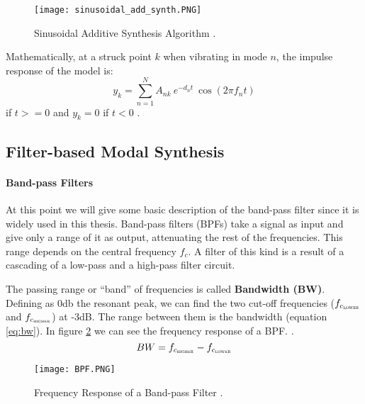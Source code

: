 \begin{figure}[H]
  \centering
    \texttt{[image: sinusoidal\_add\_synth.PNG]}
      \caption{Sinusoidal Additive Synthesis Algorithm \cite{Cook:2002:RSS:515316}.}
      \label{fig:sin_add_synth}
\end{figure}

Mathematically, at a struck point $k$ when vibrating in mode $n$, the impulse response of the model is:
\begin{equation}\label{eq:modal_response}
y_k = \sum\limits_{n=1}^{N} A_{nk}\ e^{-d_n t}\ \cos(2 \pi f_nt)
\end{equation}
if $t>=0$ and $y_k = 0$ if $t<0$ \cite{van2001foleyautomatic}.

\subsection{Filter-based Modal Synthesis}\label{sec:add_synth}

\paragraph{Band-pass Filters\\}\label{par:bpf}

At this point we will give some basic description of the band-pass filter since it is widely used in this thesis. Band-pass filters (BPFs) take a signal as input and give only a range of it as output, attenuating the rest of the frequencies. This range depends on the central frequency $f_c$. A filter of this kind is a result of a cascading of a low-pass and a high-pass filter circuit.

The passing range or ``band'' of frequencies is called \textbf{Bandwidth (BW)}. Defining as 0db the resonant peak, we can find the two cut-off frequencies ($f_{c{_\textsc{lower}}}$ and $f_{c_{\textsc{higher}}}$) at -3dB. The range between them is the bandwidth (equation \ref{eq:bw}). In figure \ref{fig:resp_bpf} we can see the frequency response of a BPF. \cite{bib:bpf}. 
\begin{equation}\label{eq:bw}
BW = f_{c_{\textsc{higher}}}-f_{c_{\textsc{lower}}}
\end{equation}   

\begin{figure}[H]
  \centering
    \texttt{[image: BPF.PNG]}
      \caption{Frequency Response of a Band-pass Filter  \cite{bib:bpf}.}
      \label{fig:resp_bpf}
\end{figure}

